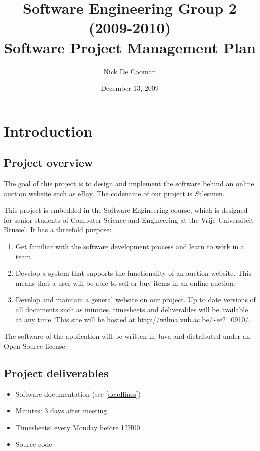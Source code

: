 \documentclass[a4paper, 12pt]{report}
\title{Software Engineering Group 2 (2009-2010) \\Software Project Management Plan}
\author{Nick De Cooman}
\date {December 13, 2009}
\begin{document}
	
	\maketitle
	
	\setcounter{tocdepth}{1}	
	\tableofcontents
	
	\chapter{Introduction}
	
		\section{Project overview}
		
			The goal of this project is to design and implement the software 
			behind an online auction website such as eBay. The codename of our project 
			is {\emph Salesmen}. 

			This project is embedded in the Software Engineering course, 
			which is designed for senior students of Computer Science and Engineering 
			at the Vrije Universiteit Brussel. It has a threefold purpose:
			
			\begin{enumerate}
				\item Get familiar with the software development process and learn to work
				in a team.
				
				\item Develop a system that supports the functionality of an auction website. 
				This means that a user will be able to sell or buy items in an online auction. 
				
				\item Develop and maintain a general website on our project. Up to date 
				versions of all documents such as minutes, timesheets and deliverables will be 
				available at any time. This site will be hosted at
				\url{http://wilma.vub.ac.be/~se2_0910/}.
			\end{enumerate}	
			
			The software of the application will be written in Java and 
			distributed under an Open Source license.	
		
		\section{Project deliverables}
		
		\begin{itemize}
			
			\item Software documentation (see \ref{deadlines})
			\item Minutes: 3 days after meeting
			\item Timesheets: every Monday before 12H00
			\item Source code
			
		\end{itemize}	
		
\end{document}
